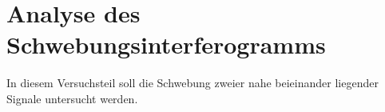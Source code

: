 \section{Analyse des Schwebungsinterferogramms}
In diesem Versuchsteil soll die Schwebung zweier nahe beieinander liegender Signale untersucht werden.